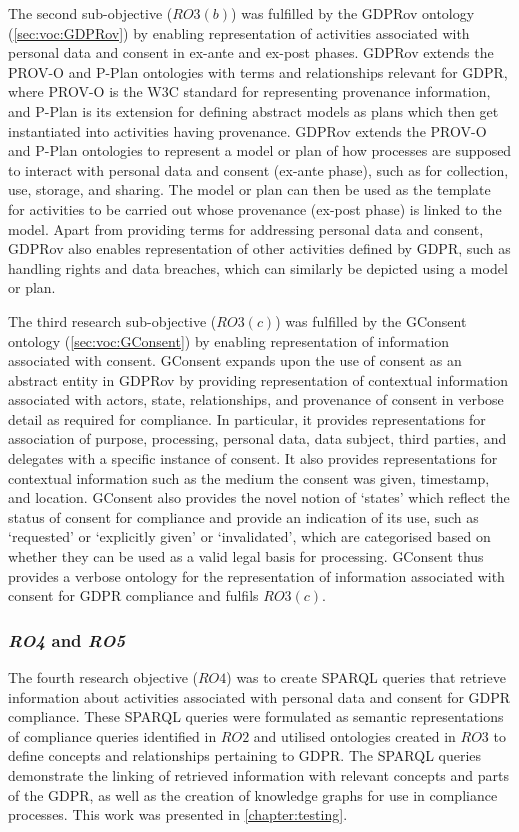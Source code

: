 The second sub-objective ($RO3(b)$) was fulfilled by the GDPRov ontology (\autoref{sec:voc:GDPRov}) by enabling representation of activities associated with personal data and consent in ex-ante and ex-post phases. GDPRov extends the PROV-O \cite{lebo_prov-o_2013} and P-Plan \cite{garijo_p-plan_2014} ontologies with terms and relationships relevant for GDPR, where PROV-O is the W3C standard for representing provenance information, and P-Plan is its extension for defining abstract models as plans which then get instantiated into activities having provenance. GDPRov extends the PROV-O and P-Plan ontologies to represent a model or plan of how processes are supposed to interact with personal data and consent (ex-ante phase), such as for collection, use, storage, and sharing. The model or plan can then be used as the template for activities to be carried out whose provenance (ex-post phase) is linked to the model. Apart from providing terms for addressing personal data and consent, GDPRov also enables representation of other activities defined by GDPR, such as handling rights and data breaches, which can similarly be depicted using a model or plan.

The third research sub-objective ($RO3(c)$) was fulfilled by the GConsent ontology (\autoref{sec:voc:GConsent}) by enabling representation of information associated with consent. GConsent expands upon the use of consent as an abstract entity in GDPRov by providing representation of contextual information associated with actors, state, relationships, and provenance of consent in verbose detail as required for compliance. In particular, it provides representations for association of purpose, processing, personal data, data subject, third parties, and delegates with a specific instance of consent. It also provides representations for contextual information such as the medium the consent was given, timestamp,  and location. GConsent also provides the novel notion of `states' which reflect the status of consent for compliance and provide an indication of its use, such as `requested' or `explicitly given' or `invalidated', which are categorised based on whether they can be used as a valid legal basis for processing. GConsent thus provides a verbose ontology for the representation of information associated with consent for GDPR compliance and fulfils $RO3(c)$.

\subsubsection*{\textit{RO4} and \textit{RO5}}
The fourth research objective ($RO4$) was to create SPARQL queries that retrieve information about activities associated with personal data and consent for GDPR compliance. These SPARQL queries were formulated as semantic representations of compliance queries identified in $RO2$ and utilised ontologies created in $RO3$ to define concepts and relationships pertaining to GDPR. The SPARQL queries demonstrate the linking of retrieved information with relevant concepts and parts of the GDPR, as well as the creation of knowledge graphs for use in compliance processes. This work was presented in \autoref{chapter:testing}.

